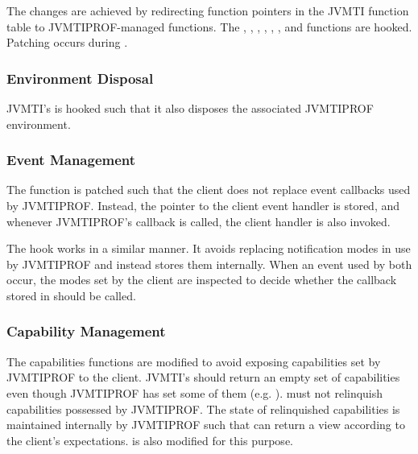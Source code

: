 The changes are achieved by redirecting function pointers in the JVMTI function table to JVMTIPROF-managed functions. The , , , , , ,  and  functions are hooked. Patching occurs during .

\subsubsection*{Environment Disposal}

JVMTI's  is hooked such that it also disposes the associated JVMTIPROF environment.

\subsubsection*{Event Management}

The  function is patched such that the client does not replace event callbacks used by JVMTIPROF. Instead, the pointer to the client event handler is stored, and whenever JVMTIPROF's callback is called, the client handler is also invoked.

The  hook works in a similar manner. It avoids replacing notification modes in use by JVMTIPROF and instead stores them internally. When an event used by both occur, the modes set by the client are inspected to decide whether the callback stored in  should be called.

\subsubsection*{Capability Management}

The capabilities functions are modified to avoid exposing capabilities set by JVMTIPROF to the client. JVMTI's  should return an empty set of capabilities even though JVMTIPROF has set some of them (e.g. ).  must not relinquish capabilities possessed by JVMTIPROF. The state of relinquished capabilities is maintained internally by JVMTIPROF such that  can return a view according to the client's expectations.  is also modified for this purpose.

